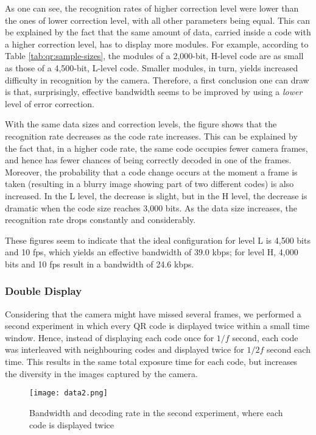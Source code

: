 As one can see, the recognition rates of higher correction level were lower than the ones of lower correction level, with all other parameters being equal. This can be explained by the fact that the same amount of data, carried inside a code with a higher correction level, has to display more modules. For example, according to Table \ref{tab:qr:sample-sizes}, the modules of a 2,000-bit, H-level code are as small as those of a 4,500-bit, L-level code. Smaller modules, in turn, yields increased difficulty in recognition by the camera. Therefore, a first conclusion one can draw is that, surprisingly, effective bandwidth seems to be improved by using a \emph{lower} level of error correction.

With the same data sizes and correction levels, the figure shows that the recognition rate decreases as the code rate increases. This can be explained by the fact that, in a higher code rate, the same code occupies fewer camera frames, and hence has fewer chances of being correctly decoded in one of the frames. Moreover, the probability that a code change occurs at the moment a frame is taken (resulting in a blurry image showing part of two different codes) is also increased. In the L level, the decrease is slight, but in the H level, the decrease is dramatic when the code size reaches 3,000 bits. As the data size increases, the recognition rate drops constantly and considerably.

These figures seem to indicate that the ideal configuration for level L is 4,500 bits and 10 fps, which yields an effective bandwidth of 39.0 kbps; for level H, 4,000 bits and 10 fps result in a bandwidth of 24.6 kbps.

\subsubsection{Double Display}

Considering that the camera might have missed several frames, we performed a second experiment in which every QR code is displayed twice within a small time window. Hence, instead of displaying each code once for $1/f$ second, each code was interleaved with neighbouring codes and displayed twice for $1/2f$ second each time. This results in the same total exposure time for each code, but increases the diversity in the images captured by the camera.

\begin{figure}[ht]
\begin{center}
\centering
\texttt{[image: data2.png]}
\caption{Bandwidth and decoding rate in the second experiment, where each code is displayed twice}
\label{img-exp2}
\end{center}
\end{figure}


